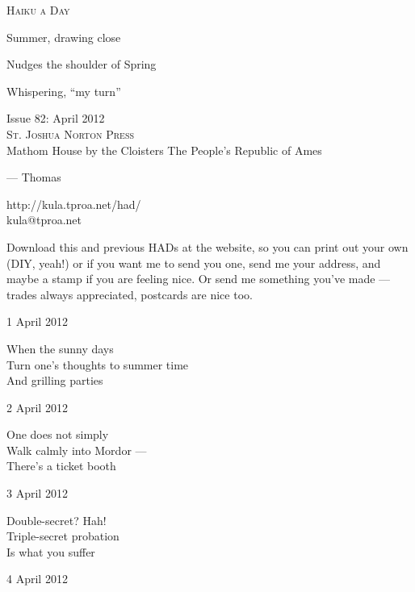 \documentclass[12pt]{article}
\begin{document}
\begin{center}
{\fontsize{36}{48}\selectfont \textsc{Haiku a Day }}
\end{center}

\vspace*{3.5cm}

{\fontsize{20}{40}\selectfont 

Summer, drawing close

Nudges the shoulder of Spring

Whispering, ``my turn''


}

\vspace*{5.0cm}
\begin{center}
{\large{Issue 82: April 2012}} \\[5mm]
{\fontsize{8}{8}\selectfont  \textsc{ St. Joshua Norton Press }} \\[1mm]
{\fontsize{6}{6}\selectfont Mathom House by the Cloisters \textbar The People's Republic of Ames }
\end{center}


\newpage



--- Thomas

http://kula.tproa.net/had/ \\
kula@tproa.net

Download this and previous HADs at the website, so you can
print out your own (DIY, yeah!) or if you want me to send
you one, send me your address, and maybe a stamp if you
are feeling nice. Or send me something you've made ---
trades always appreciated, postcards are nice too.

\vfill

1 April 2012

When the sunny days \\
Turn one's thoughts to summer time \\
And grilling parties

2 April 2012

One does not simply \\
Walk calmly into Mordor --- \\
There's a ticket booth

\newpage

3 April 2012

Double-secret? Hah! \\
Triple-secret probation \\
Is what you suffer

4 April 2012
\end{document}
